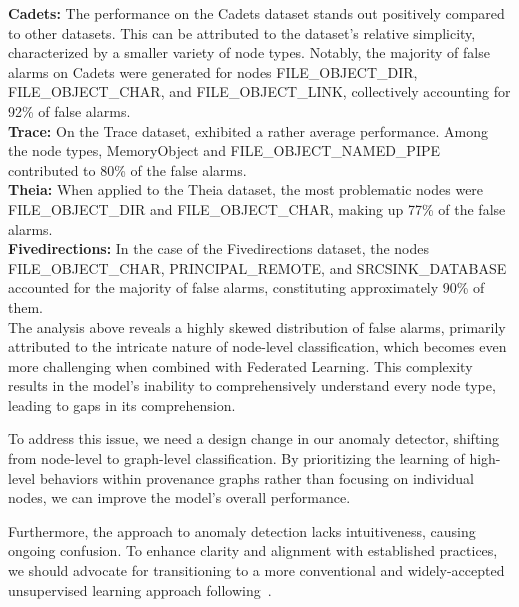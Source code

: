   \textbf{Cadets:} The performance on the Cadets dataset stands out positively compared to other datasets. This can be attributed to the dataset's relative simplicity, characterized by a smaller variety of node types. Notably, the majority of false alarms on Cadets were generated for nodes FILE\_OBJECT\_DIR, FILE\_OBJECT\_CHAR, and FILE\_OBJECT\_LINK, collectively accounting for 92\% of false alarms.\\

  \textbf{Trace:} On the Trace dataset, \Sys exhibited a rather average performance. Among the node types, MemoryObject and FILE\_OBJECT\_NAMED\_PIPE contributed to 80\% of the false alarms.\\

  \textbf{Theia:} When applied to the Theia dataset, the most problematic nodes were FILE\_OBJECT\_DIR and FILE\_OBJECT\_CHAR, making up 77\% of the false alarms.\\

  \textbf{Fivedirections:} In the case of the Fivedirections dataset, the nodes FILE\_OBJECT\_CHAR, PRINCIPAL\_REMOTE, and SRCSINK\_DATABASE accounted for the majority of false alarms, constituting approximately 90\% of them.\\

  The analysis above reveals a highly skewed distribution of false alarms, primarily attributed to the intricate nature of node-level classification, which becomes even more challenging when combined with Federated Learning. This complexity results in the model's inability to comprehensively understand every node type, leading to gaps in its comprehension.

  To address this issue, we need a design change in our anomaly detector, shifting from node-level to graph-level classification. By prioritizing the learning of high-level behaviors within provenance graphs rather than focusing on individual nodes, we can improve the model's overall performance.

  Furthermore, the \threatrace approach to anomaly detection lacks intuitiveness, causing ongoing confusion. To enhance clarity and alignment with established practices, we should advocate for transitioning to a more conventional and widely-accepted unsupervised learning approach following~\cite{yangprographer,shadewatcher,sigl}.
